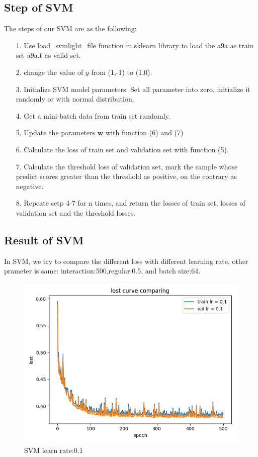 \documentclass[journal, a4paper]{IEEEtran}
\begin{document}
\subsection{Step of SVM}
The steps of our SVM are as the following:
\begin{itemize}
\item[1.] Use load\_svmlight\_file function in sklearn library to load the a9a as train set a9a.t as valid set.
\item[2.] change the value of $y$ from (1,-1) to (1,0).
\item[3.]Initialize SVM model parameters. Set all parameter into zero, initialize it randomly or with normal distribution.
\item[4.] Get a mini-batch data from train set randomly.
\item[5.] Update the parameters $\boldsymbol{w}$ with function (6) and (7)
\item[6.] Calculate the loss of train set and validation set with function (5).
\item[7.] Calculate the threshold loss of validation set, mark the sample whose predict scores greater than the threshold as positive, on the contrary as negative.
\item[8.] Repeate setp 4-7 for n times, and return the losses of train set, losses of validation set and the threshold losses.
\end{itemize}

\subsection{Result of SVM}
In SVM, we try to compare the different loss with different learning rate, other prameter is same: interaction:500,regular:0.5, and batch size:64.

\begin{figure}[!htb]
	\begin{center}
	\includegraphics[width=\columnwidth]{lc_1}
	\caption{SVM learn rate:0.1}
	\label{fig:lc_1}
	\end{center}
\end{figure}
\end{document}
